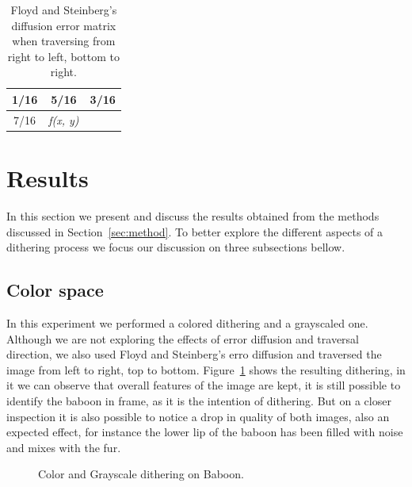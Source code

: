 \documentclass[conference]{IEEEtran}
\begin{document}
\begin{table}[H]
\centering
\renewcommand{\arraystretch}{1.5}
\begin{tabular}{c|c|c}
1/16 & 5/16             & 3/16 \\ \hline
7/16 & \textit{f(x, y)} &     
\end{tabular}
\caption{Floyd and Steinberg's diffusion error matrix when traversing from right to left, bottom to right.}
\label{tab:flo_inverse}
\end{table}

\section{Results}
\label{sec:results}

In this section we present and discuss the results obtained from the methods discussed in Section~\ref{sec:method}. To better explore the different aspects of a dithering process we focus our discussion on three subsections bellow.

\subsection{Color space}

In this experiment we performed a colored dithering and a grayscaled one. Although we are not exploring the effects of error diffusion and traversal direction, we also used Floyd and Steinberg's erro diffusion and traversed the image from left to right, top to bottom. Figure~\ref{fig:baboon_colorspace} shows the resulting dithering, in it we can observe that overall features of the image are kept, it is still possible to identify the baboon in frame, as it is the intention of dithering. But on a closer inspection it is also possible to notice a drop in quality of both images, also an expected effect, for instance the lower lip of the baboon has been filled with noise and mixes with the fur.

\begin{figure}[H]
	\centering
	\quad
	\caption{Color and Grayscale dithering on Baboon.}
	\label{fig:baboon_colorspace}
\end{figure}
\end{document}
